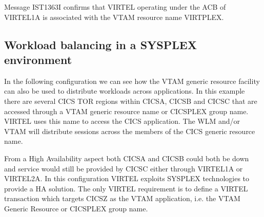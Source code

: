 \documentclass[letterpaper,10pt,english]{sphinxmanual}
\begin{document}
\begin{sphinxVerbatim}[commandchars=\\\{\}]
          
   
         
        
 
        
      
 
\end{sphinxVerbatim}

Message IST1363I confirms that VIRTEL operating under the ACB of VIRTEL1A is associated with the VTAM resource name VIRTPLEX.

\newpage

\ignorespaces 

\subsection{Workload balancing in a SYSPLEX environment}
\label{\detokenize{connectivity_guide:workload-balancing-in-a-sysplex-environment}}\label{\detokenize{connectivity_guide:index-172}}
In the following configuration we can see how the VTAM generic resource facility can also be used to distribute workloads across applications. In this example there are several CICS TOR regions within CICSA, CICSB and CICSC that are accessed through a VTAM generic resource name or CICSPLEX group name. VIRTEL uses this name to access the CICS application. The WLM and/or VTAM will distribute sessions across the members of the CICS generic resource name.


From a High Availability aspect both CICSA and CICSB could both be down and service would still be provided by CICSC either through VIRTEL1A or VIRTEL2A. In this configuration VIRTEL exploits SYSPLEX technologies to provide a HA solution. The only VIRTEL requirement is to define a VIRTEL transaction which targets CICSZ as the VTAM application, i.e. the VTAM
Generic Resource or CICSPLEX group name.
\end{document}
